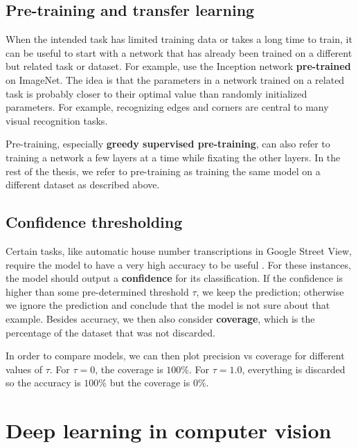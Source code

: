 \subsection{Pre-training and transfer learning}

When the intended task has limited training data or takes a long time to train, it can be useful to start with a network that has already been trained on a different but related task or dataset.
For example, \cite{SpatialTransformerNetworks} use the Inception network \textbf{pre-trained} on ImageNet.
The idea is that the parameters in a network trained on a related task is probably closer to their optimal value than randomly initialized parameters. For example, recognizing edges and corners are central to many visual recognition tasks.

Pre-training, especially \textbf{greedy supervised pre-training}, can also refer to training a network a few layers at a time while fixating the other layers. In the rest of the thesis, we refer to pre-training as training the same model on a different dataset as described above.


\subsection{Confidence thresholding}

Certain tasks, like automatic house number transcriptions in Google Street View, require the model to have a very high accuracy to be useful \cite{multidigit_streetview}.
For these instances, the model should output a \textbf{confidence} for its classification. If the confidence is higher than some pre-determined threshold $\tau$, we keep the prediction; otherwise we ignore the prediction and conclude that the model is not sure about that example.
Besides accuracy, we then also consider \textbf{coverage}, which is the percentage of the dataset that was not discarded.

In order to compare models, we can then plot precision vs coverage for different values of $\tau$. For $\tau=0$, the coverage is $100\%$. For $\tau=1.0$, everything is discarded so the accuracy is $100\%$ but the coverage is $0\%$.

\section{Deep learning in computer vision}

